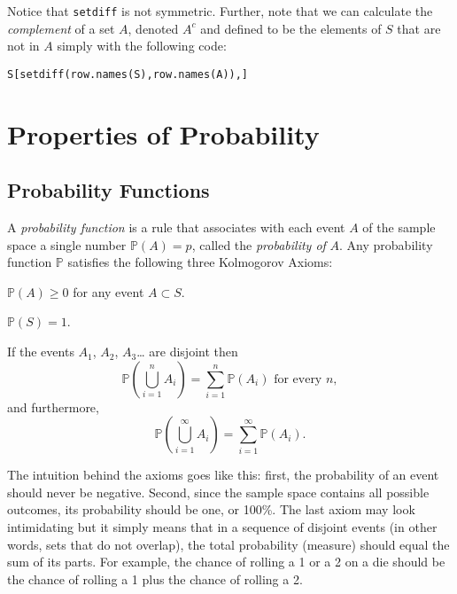 Notice that \texttt{setdiff} is not symmetric. Further, note that we can
calculate the \emph{complement} of a set \(A\), denoted \(A^{c}\) and
defined to be the elements of \(S\) that are not in \(A\) simply with
the following code:
\begin{Verbatim}
S[setdiff(row.names(S),row.names(A)),]
\end{Verbatim}

\section{Properties of Probability}
\label{sec-4-4}

\subsection{Probability Functions}
\label{sec-4-4-1}

A \emph{probability function} is a rule that associates with each event
\(A\) of the sample space a single number \(\mathbb{P}(A)=p\), called
the \emph{probability of} \(A\). Any probability function \(\mathbb{P}\)
satisfies the following three Kolmogorov Axioms:

\begin{ax}
\label{ax-prob-nonnegative} \(\mathbb{P}(A)\geq0\) for any event \(A\subset S\).
\end{ax}

\begin{ax}
\label{ax-total-mass-one} \(\mathbb{P}(S)=1\).
\end{ax}

\begin{ax}
\label{ax-countable-additivity} If the events \(A_{1}\), \(A_{2}\),
\(A_{3}\)\ldots{} are disjoint then
\begin{equation}
\mathbb{P}\left(\bigcup_{i=1}^{n}A_{i}\right)=\sum_{i=1}^{n}\mathbb{P}(A_{i})\mbox{ for every }n,
\end{equation}
and furthermore,
\begin{equation}
\mathbb{P}\left(\bigcup_{i=1}^{\infty}A_{i}\right)=\sum_{i=1}^{\infty}\mathbb{P}(A_{i}).
\end{equation}
\end{ax}

The intuition behind the axioms goes like this: first, the probability
of an event should never be negative. Second, since the sample space
contains all possible outcomes, its probability should be one, or
100\%. The last axiom may look intimidating but it simply means that in
a sequence of disjoint events (in other words, sets that do not
overlap), the total probability (measure) should equal the sum of its
parts. For example, the chance of rolling a 1 or a 2 on a die should
be the chance of rolling a 1 plus the chance of rolling a 2.

